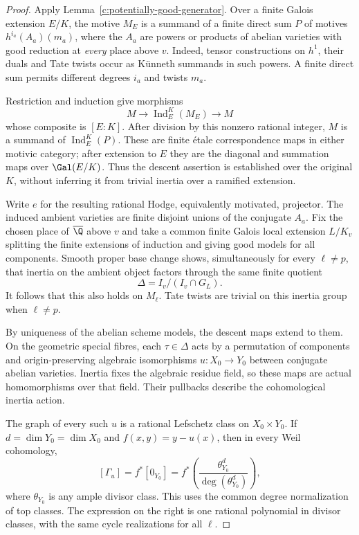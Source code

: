 \begin{proof}
Apply Lemma~\ref{c:potentially-good-generator}.  Over a finite Galois
extension $E/K$, the motive $M_E$ is a summand of a finite direct sum $P$
of motives $h^{i_a}(A_a)(m_a)$, where the $A_a$ are powers or products of
abelian varieties with good reduction at \emph{every} place above $v$.
Indeed, tensor constructions on $h^1$, their duals and Tate twists occur
as K\"unneth summands in such powers.  A finite direct sum permits different
degrees $i_a$ and twists $m_a$.

Restriction and induction give morphisms
\[
 M\longrightarrow\operatorname{Ind}_E^K(M_E)\longrightarrow M
\]
whose composite is $[E:K]$.  After division by this nonzero rational
integer, $M$ is a summand of $\operatorname{Ind}_E^K(P)$.
These are finite \'etale correspondence maps in either motivic category;
after extension to $E$ they are the diagonal and summation maps over
$\Gal(E/K)$.  Thus the descent assertion is established over the original
$K$, without inferring it from trivial inertia over a ramified extension.

Write $e$ for the resulting rational Hodge, equivalently motivated,
projector.  The induced ambient varieties are finite disjoint unions of
the conjugate $A_a$.  Fix the chosen place of $\overline\Q$ above $v$ and
take a common finite Galois local extension $L/K_v$ splitting the finite
extensions of induction and giving good models for all components.
Smooth proper base change shows, simultaneously for every $\ell\ne p$,
that inertia on the ambient object factors through the same finite
quotient
\[
 \Delta=I_v/(I_v\cap G_L).
\]
It follows that this also holds on $M_\ell$.  Tate twists are trivial on
this inertia group when $\ell\ne p$.

By uniqueness of the abelian scheme models, the descent maps extend to
them.  On the geometric special fibres, each $\tau\in\Delta$ acts by a
permutation of components and origin-preserving algebraic isomorphisms
$u:X_0\to Y_0$ between conjugate abelian varieties.  Inertia fixes the
algebraic residue field, so these maps are actual homomorphisms over that
field.  Their pullbacks describe the cohomological inertia action.

The graph of every such $u$ is a rational Lefschetz class on $X_0\times Y_0$.
If $d=\dim Y_0=\dim X_0$ and $f(x,y)=y-u(x)$, then in every Weil
cohomology,
\begin{equation}
\label{c:inertia-graph-lefschetz}
 [\Gamma_u]=f^*[0_{Y_0}]
   =f^*\left(\frac{\theta_{Y_0}^{d}}
                         {\deg(\theta_{Y_0}^{d})}\right),
\end{equation}
where $\theta_{Y_0}$ is any ample divisor class.  This uses the common
degree normalization of top classes.  The expression on the right is one
rational polynomial in divisor classes, with the same cycle realizations
for all $\ell$.


\end{proof}
